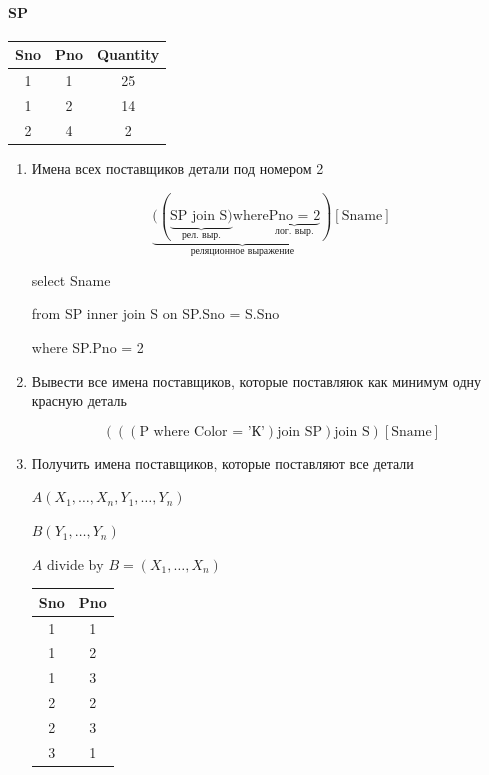 \documentclass[a4paper, 14pt]{report}
\begin{document}
\paragraph{SP}

\hfill

\begin{tabular}{|c|c|c|}
    \hline
    Sno & Pno & Quantity \\
    \hline
    1 & 1 & 25 \\
    1 & 2 & 14 \\
    2 & 4 & 2 \\
    \hline
\end{tabular}

\begin{enumerate}
    \item Имена всех поставщиков детали под номером 2

        $$
        \underbrace{((\underbrace{\text{SP join S})}_\text{рел. выр.} \text{where} \underbrace{\text{Pno = 2}}_{\text{лог. выр.}})}_\text{реляционное выражение}[\text{Sname}]
        $$

        select Sname

        from SP inner join S on SP.Sno = S.Sno

        where SP.Pno = 2

    \item Вывести все имена поставщиков, которые поставляюк как минимум одну красную деталь

        $$
        (((\text{P where } \text{Color = 'К'}) \text{join SP}) \text{join S})[\text{Sname}]
        $$

    \item Получить имена поставщиков, которые поставляют все детали

        $A(X_1, \dots, X_n, Y_1, \dots, Y_n)$

        $B(Y_1, \dots, Y_n)$

        $A \text{ divide by } B = (X_1, \dots, X_n)$

        \begin{tabular}{|c|c|}
            \hline
            Sno & Pno \\
            \hline
            1 & 1 \\
            1 & 2 \\
            1 & 3 \\
            2 & 2 \\
            2 & 3 \\
            3 & 1 \\
            \hline
        \end{tabular}


\end{enumerate}
\end{document}
